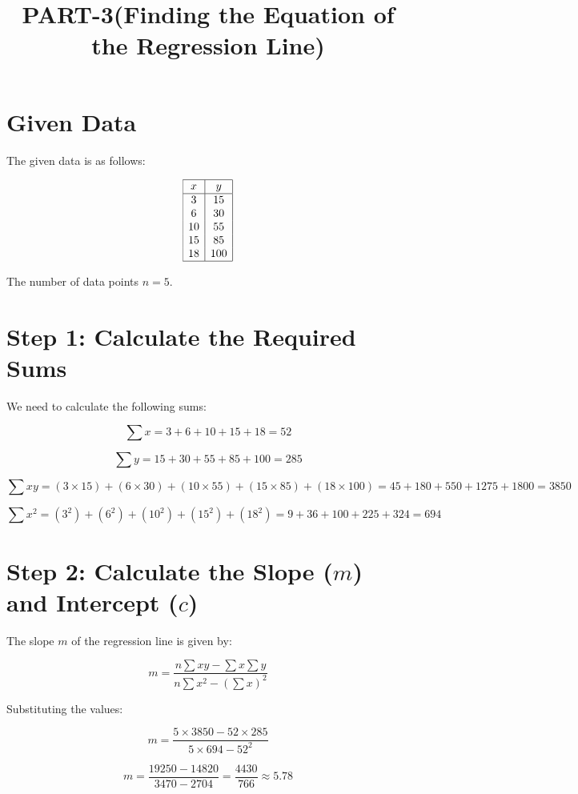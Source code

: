 \documentclass{article}
\title{PART-3(Finding the Equation of the Regression Line)}
\author{}
\date{}
\begin{document}
\maketitle

\section*{Given Data}

The given data is as follows:

\[
\begin{array}{|c|c|}
\hline
x & y \\
\hline
3 & 15 \\
6 & 30 \\
10 & 55 \\
15 & 85 \\
18 & 100 \\
\hline
\end{array}
\]

The number of data points \( n = 5 \).

\section*{Step 1: Calculate the Required Sums}

We need to calculate the following sums:

\[
\sum x = 3 + 6 + 10 + 15 + 18 = 52
\]

\[
\sum y = 15 + 30 + 55 + 85 + 100 = 285
\]

\[
\sum xy = (3 \times 15) + (6 \times 30) + (10 \times 55) + (15 \times 85) + (18 \times 100) = 45 + 180 + 550 + 1275 + 1800 = 3850
\]

\[
\sum x^2 = (3^2) + (6^2) + (10^2) + (15^2) + (18^2) = 9 + 36 + 100 + 225 + 324 = 694
\]

\section*{Step 2: Calculate the Slope (\( m \)) and Intercept (\( c \))}

The slope \( m \) of the regression line is given by:

\[
m = \frac{n \sum xy - \sum x \sum y}{n \sum x^2 - (\sum x)^2}
\]

Substituting the values:

\[
m = \frac{5 \times 3850 - 52 \times 285}{5 \times 694 - 52^2}
\]

\[
m = \frac{19250 - 14820}{3470 - 2704} = \frac{4430}{766} \approx 5.78
\]
\end{document}
